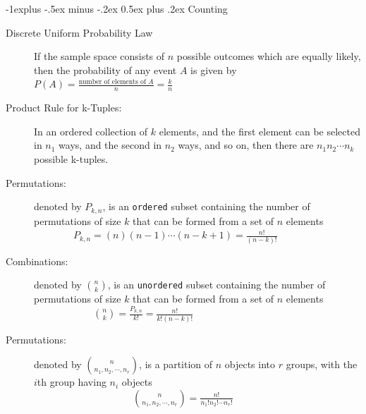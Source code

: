 \documentclass[10pt,landscape]{article}
\makeatletter
\renewcommand{\subsection}{\@startsection{subsection}{2}{0mm}%
                                {-1explus -.5ex minus -.2ex}%
                                {0.5ex plus .2ex}%
                                {\normalfont\normalsize\bfseries}}
\makeatother
\begin{document}
\begin{multicols}{3}
\subsection{Counting}
\begin{description}
\item[Discrete Uniform Probability Law] If the sample space consists of $n$ possible outcomes which are equally likely, then the probability of any event $A$ is given by $P(A) = \frac{\text{number of elements of }A}{n} = \frac{k}{n}$
\item[Product Rule for k-Tuples:] In an ordered collection of $k$ elements, and the first element can be selected in $n_1$ ways, and the second in $n_2$ ways, and so on, then there are $n_1  n_2 \cdots n_k$ possible k-tuples.
\item[Permutations:] denoted by $P_{k,n}$, is an \verb!ordered! subset containing the number of permutations of size $k$ that can be formed from a set of $n$ elements\\
 {\footnotesize$\qquad \qquad  P_{k,n} = (n)(n-1)\cdots(n-k+1) = \frac{n!}{(n-k)!}$}
\item[Combinations:] denoted by ${n \choose k}$, is an \verb!unordered! subset containing the number of permutations of size $k$ that can be formed from a set of $n$ elements
 {\footnotesize$\qquad \qquad \qquad {n \choose k} = \frac{P_{k,n}}{k!} = \frac{n!}{k!(n-k)!}$}
 \item[Permutations:] denoted by ${n \choose n_1, n_2, \cdots, n_r}$, is a partition of $n$ objects into $r$ groups, with the $i$th group having $n_i$ objects \\
 {\footnotesize$\qquad \qquad \qquad \qquad \qquad {n \choose n_1, n_2, \cdots, n_r} = \frac{n!}{n_1!n_2!\cdots n_r!}$}
\end{description}


\end{multicols}
\end{document}
